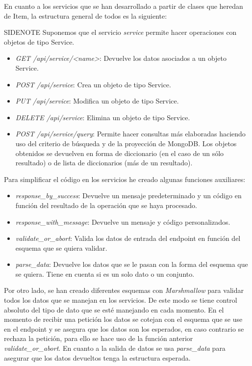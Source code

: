 En cuanto a los servicios que se han desarrollado a partir de clases que heredan de Item, la estructura general de todos es la siguiente:

\bigskip
SIDENOTE Suponemos que el servicio \textit{service} permite hacer operaciones con objetos de tipo Service.
\begin{itemize}
	\item \textit{GET /api/service/<name>}: Devuelve los datos asociados a un objeto Service.
	\item \textit{POST /api/service}: Crea un objeto de tipo Service.
	\item \textit{PUT /api/service}: Modifica un objeto de tipo Service.
	\item \textit{DELETE /api/service}: Elimina un objeto de tipo Service.
	\item \textit{POST /api/service/query}: Permite hacer consultas más elaboradas haciendo uso del criterio de búsqueda y de la proyección de MongoDB. Los objetos obtenidos se devuelven en forma de diccionario (en el caso de un sólo resultado) o de lista de diccionarios (más de un resultado).
\end{itemize}


\bigskip
Para simplificar el código en los servicios he creado algunas funciones auxiliares:
\begin{itemize}
	\item \textit{response\_by\_success}: Devuelve un mensaje predeterminado y un código en función del resultado de la operación que se haya procesado.
	\item \textit{response\_with\_message}: Devuelve un mensaje y código personalizados.
	\item \textit{validate\_or\_abort}: Valida los datos de entrada del endpoint en función del esquema que se quiera validar.
	\item \textit{parse\_data}: Devuelve los datos que se le pasan con la forma del esquema que se quiera. Tiene en cuenta si es un solo dato o un conjunto.
\end{itemize}


\bigskip
Por otro lado, se han creado diferentes esquemas con \textit{Marshmallow} para validar todos los datos que se manejan en los servicios. De este modo se tiene control absoluto del tipo de dato que se esté manejando en cada momento. En el momento de recibir una petición los datos se cotejan con el esquema que se use en el endpoint y se asegura que los datos son los esperados, en caso contrario se rechaza la petición, para ello se hace uso de la función anterior \textit{validate\_or\_abort}. En cuanto a la salida de datos se usa \textit{parse\_data} para asegurar que los datos devueltos tenga la estructura esperada.


